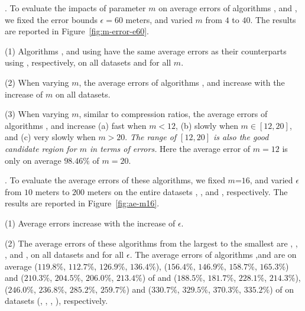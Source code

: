 .
To evaluate the impacts of parameter $m$ on average errors of algorithms \cisto, \cist and \cista, we fixed the error bounds {$\epsilon =60$ meters}, and varied $m$ from $4$ to $40$. The results are reported in Figure~\ref{fig:m-error-e60}.



\ni(1) Algorithms \cisto, \cist and \cista using \rpia have the same average errors as their counterparts using \cpia, respectively, on all datasets and for all $m$.

\ni(2) When varying $m$, the average errors of algorithms \cisto, \cist and \cista increase with the increase of $m$ on all datasets.

\ni(3) When varying $m$, similar to compression ratios, the average errors of
algorithms \cisto, \cist and \cista increase (a) fast when $m < 12$, (b) slowly when $m
\in [12, 20]$, and (c) very slowly when $m > 20$.
\emph{The range of $[12, 20]$ is also the good candidate region for $m$ in terms of errors.}
Here the average error of $m=12$ is only on average {$98.46\%$} of $m=20$.




.
To evaluate the average errors of these algorithms, we fixed {$m$=$16$}, and
varied $\epsilon$ from $10$ meters to $200$ meters on the entire
{datasets} \sercar, \geolife, \mopsi and \pricar, respectively.
The results are reported in Figure~\ref{fig:ae-m16}.

\ni(1) Average errors increase with the increase of $\epsilon$.

\ni(2) The average errors of these algorithms from the largest to the smallest are \cista, \cisto, \cist, \dps and \squishe, on all datasets and for all $\epsilon$.
The average errors of algorithms \cist,\cisto and \cista are on average
($119.8\%$, $112.7\%$, $126.9\%$, $136.4\%$), 
($156.4\%$, $146.9\%$, $158.7\%$, $165.3\%$)
and ($210.3\%$, $204.5\%$, $206.0\%$, $213.4\%$)
of \dps and ($188.5\%$, $181.7\%$, $228.1\%$, $214.3\%$),
($246.0\%$, $236.8\%$, $285.2\%$, $259.7\%$) and 
($330.7\%$, $329.5\%$, $370.3\%$, $335.2\%$)
 of \squishe on {datasets} (\sercar, \geolife, \mopsi, \pricar), respectively.


